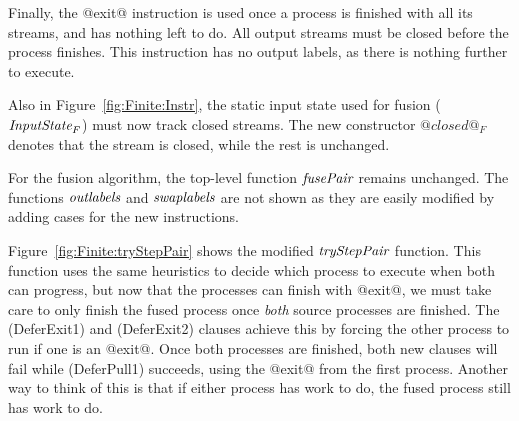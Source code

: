 Finally, the @exit@ instruction is used once a process is finished with all its streams, and has nothing left to do. All output streams must be closed before the process finishes. This instruction has no output labels, as there is nothing further to execute.

Also in Figure~\ref{fig:Finite:Instr}, the static input state used for fusion ($\textit{InputState}_F$) must now track closed streams. The new constructor $@closed@_F$ denotes that the stream is closed, while the rest is unchanged.

For the fusion algorithm, the top-level function $\textit{fusePair}$ remains unchanged. The functions $\textit{outlabels}$ and $\textit{swaplabels}$ are not shown as they are easily modified by adding cases for the new instructions.

Figure~\ref{fig:Finite:tryStepPair} shows the modified $\textit{tryStepPair}$ function. This function uses the same heuristics to decide which process to execute when both can progress, but now that the processes can finish with @exit@, we must take care to only finish the fused process once \emph{both} source processes are finished. The (DeferExit1) and (DeferExit2) clauses achieve this by forcing the other process to run if one is an @exit@. Once both processes are finished, both new clauses will fail while (DeferPull1) succeeds, using the @exit@ from the first process. Another way to think of this is that if either process has work to do, the fused process still has work to do.

